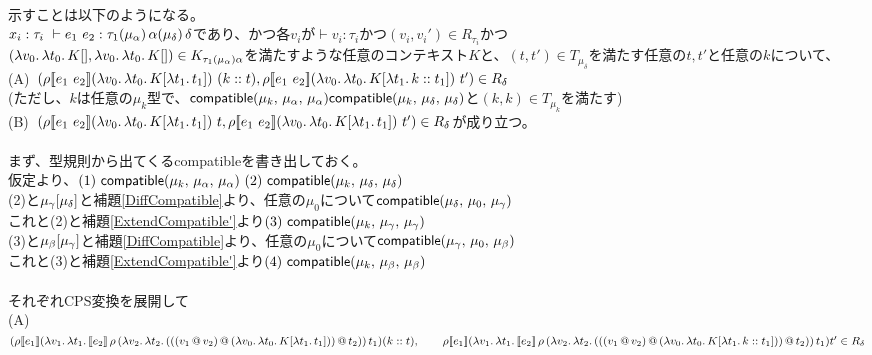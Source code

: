 \\
示すことは以下のようになる。\\
$x_i:\tau_i\ \vdash e_1\ e_2:\tau_1 (\mu_{\alpha})\,\alpha (\mu_{\delta})\,\delta$であり、かつ各$v_i$が$\vdash v_i:\tau_i$かつ$(v_i,v_i') \in R_{\tau_i}$かつ\\
$(\lambda{v_0}.\,{\lambda{t_0}.\,{K[]}}, \lambda{v_0}.\,{\lambda{t_0}.\,{K[]}})\in  K_{\tau_1(\mu_{\alpha})\alpha}$を満たすような任意のコンテキスト$K$と、$(t, t') \in T_{\mu_{\delta}}$を満たす任意の$t, t'$と任意の$k$について、\\
(A)\ $(\rho \CPSTh{e_1\ e_2} \LamP{v_0}{\Lam{t_0}{K[\Lam{t_1}{t_1}]}}\ (\Cons{k}{t}), \rho \CPSTh{e_1\ e_2} \LamP{v_0}{\Lam{t_0}{K[\Lam{t_1}{\Cons{k}{t_1}}]}}\ t')\in R_{\delta}$\\
(ただし、$k$は任意の$\mu_k$型で、$\textsf{compatible}(\mu_k,\,\mu_{\alpha},\,\mu_{\alpha}) \textsf{compatible}(\mu_k,\,\mu_{\delta},\,\mu_{\delta})$と$(k,k)\in T_{\mu_k}$を満たす)\\
  (B)\ $(\rho [\![{e_1\ e_2}]\!] (\lambda{v_0}.\,{\lambda{t_0}.\,{K[\lambda{t_1}.\,{t_1}]}})\ t, \rho [\![{e_1\ e_2}]\!] (\lambda{v_0}.\,{\lambda{t_0}.\,{K[\lambda{t_1}.\,{t_1}]}})\ t')\in R_{\delta}$が成り立つ。\\
\\
まず、型規則から出てくる\textsf{compatible}を書き出しておく。\\
仮定より、$(1)\ \Compatible{\mu_k}{\mu_{\alpha}}{\mu_{\alpha}}\  (2)\ \Compatible{\mu_k}{\mu_{\delta}}{\mu_{\delta}}$\\
(2)と$\mu_{\gamma} \lbrack \tiny{\mu_{\delta}} \rbrack$と補題\ref{DiffCompatible}より、任意の$\mu_0$について$\textsf{compatible}(\mu_{\delta},\,\mu_0,\,\mu_{\gamma})$\\
これと(2)と補題\ref{ExtendCompatible'}より$(3)\ \Compatible{\mu_k}{\mu_{\gamma}}{\mu_{\gamma}}$\\
(3)と$\mu_{\beta} \lbrack \tiny{\mu_{\gamma}} \rbrack$と補題\ref{DiffCompatible}より、任意の$\mu_0$について$\textsf{compatible}(\mu_{\gamma},\,\mu_0,\,\mu_{\beta})$\\
これと(3)と補題\ref{ExtendCompatible'}より$(4)\ \Compatible{\mu_k}{\mu_{\beta}}{\mu_{\beta}}$\\
\\
それぞれCPS変換を展開して\\
  (A)\ $(\rho \CPSTh{e_1}
      \LamP{v_1}{\Lam{t_1}{\CPS{e_2}{\rho}
            {\LamP{v_2}{\Lam{t_2}
                {\AppP{\AppP{\AppP{v_1}{v_2}}
                    {\LamP{v_0}{\Lam{t_0}
                        {K[\Lam{t_1}{t_1}]}}}}{t_2}}}}{t_1}}}{(\Cons{k}{t})},\\
      \qquad \rho \CPSTh{e_1}
      \LamP{v_1}{\Lam{t_1}{\CPS{e_2}{\rho}
            {\LamP{v_2}{\Lam{t_2}
                {\AppP{\AppP{\AppP{v_1}{v_2}}
                    {\LamP{v_0}{\Lam{t_0}
                        {K[\Lam{t_1}{\Cons{k}{t_1}}]}}}}{t_2}}}}{t_1}}}{t'}\in R_{\delta}$\\
